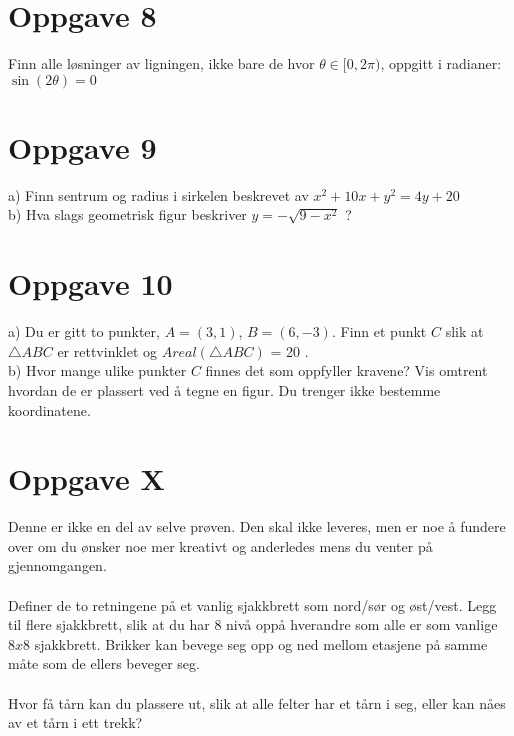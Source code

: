 \documentclass [a4paper ,10 pt]{article}
\begin{document}
\section{Oppgave 8}
Finn alle l\o sninger av ligningen, ikke bare de hvor $\theta \in [0,2\pi )$, oppgitt i radianer: $\sin(2 \theta) = 0$

\section{Oppgave 9}
\noindent a) Finn sentrum og radius i sirkelen beskrevet av $x^2 + 10x + y^2 = 4y + 20$\\
\noindent b) Hva slags geometrisk figur beskriver $y = -\sqrt{9-x^2}$ ?

\section{Oppgave 10}
\noindent a) Du er gitt to punkter, $A=(3, 1)$, $B=(6,-3)$. Finn et punkt $C$ slik at $\bigtriangleup ABC$ er rettvinklet og  $Areal(\bigtriangleup ABC)$ = 20 .\\
\noindent b) Hvor mange ulike punkter $C$ finnes det som oppfyller kravene? Vis omtrent hvordan de er plassert ved \aa \; tegne en figur. Du trenger ikke bestemme koordinatene.


\section{Oppgave X}
Denne er ikke en del av selve pr\o ven. Den skal ikke leveres, men er noe \aa \; fundere over om du \o nsker noe mer kreativt og anderledes mens du venter p\aa \; gjennomgangen.\\
\\
Definer de to retningene p\aa \; et vanlig sjakkbrett som nord/s\o r og \o st/vest. Legg til flere sjakkbrett, slik at du har 8 niv\aa \; opp\aa \; hverandre som alle er som vanlige $8x8$ sjakkbrett. Brikker kan bevege seg opp og ned mellom etasjene p\aa \; samme m\aa te som de ellers beveger seg.\\
\\
Hvor f\aa \; t\aa rn kan du plassere ut, slik at alle felter har et t\aa rn i seg, eller kan n\aa es av et t\aa rn i ett trekk?
\end{document}
